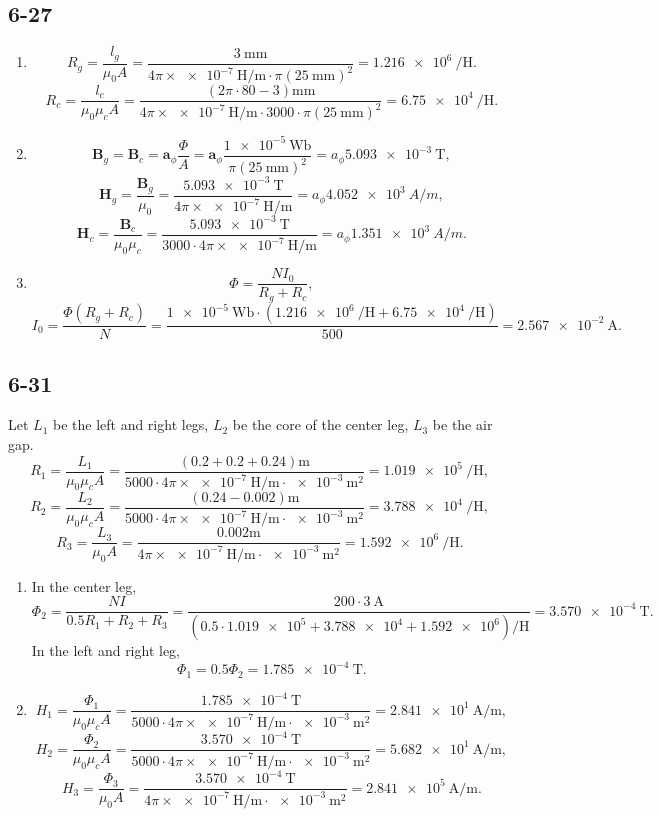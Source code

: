 \documentclass[11pt,a4paper]{article}
\author{\href{liuyh615@sjtu.edu.cn}{Yihao Liu} (515370910207)}
\subtitle{Homework}
\begin{document}
\maketitle

\subsection{6-27}
\begin{enumerate}[label=\alph*)]
\item
$$R_g=\frac{l_g}{\mu_0A}=\frac{\SI{3}{\milli\meter}}{4\pi\times\SI{e-7}{\henry/\meter}\cdot\pi(\SI{25}{\milli\meter})^2}=\SI{1.216e6}{\per\henry}.$$
$$R_c=\frac{l_c}{\mu_0\mu_cA}=\frac{(2\pi\cdot 80-3)\si{\milli\meter}}{4\pi\times\SI{e-7}{\henry/\meter}\cdot3000\cdot\pi(\SI{25}{\milli\meter})^2}=\SI{6.75e4}{\per\henry}.$$
\item
$$\mathbf{B}_g=\mathbf{B}_c=\mathbf{a}_\phi\frac{\Phi}{A}=\mathbf{a}_\phi\frac{\SI{1e-5}{\weber}}{\pi(\SI{25}{\milli\meter})^2}={a}_\phi\SI{5.093e-3}{\tesla},$$
$$\mathbf{H}_g=\frac{\mathbf{B}_g}{\mu_0}=\frac{\SI{5.093e-3}{\tesla}}{4\pi\times\SI{e-7}{\henry/\meter}}={a}_\phi\SI{4.052e3}{A/m},$$
$$\mathbf{H}_c=\frac{\mathbf{B}_c}{\mu_0\mu_c}=\frac{\SI{5.093e-3}{\tesla}}{3000\cdot4\pi\times\SI{e-7}{\henry/\meter}}={a}_\phi\SI{1.351e3}{A/m}.$$
\item
$$\Phi=\frac{NI_0}{R_g+R_c},$$
$$I_0=\frac{\Phi(R_g+R_c)}{N}=\frac{\SI{1e-5}{\weber}\cdot(\SI{1.216e6}{\per\henry}+\SI{6.75e4}{\per\henry})}{500}=\SI{2.567e-2}{\ampere}.$$
\end{enumerate}

\subsection{6-31}
Let $L_1$ be the left and right legs, $L_2$ be the core of the center leg, $L_3$ be the air gap.
$$R_1=\frac{L_1}{\mu_0\mu_cA}=\frac{(0.2+0.2+0.24)\si{\meter}}{5000\cdot4\pi\times\SI{e-7}{\henry/\meter}\cdot\SI{e-3}{\meter\squared}}=\SI{1.019e5}{\per\henry},$$
$$R_2=\frac{L_2}{\mu_0\mu_cA}=\frac{(0.24-0.002)\si{\meter}}{5000\cdot4\pi\times\SI{e-7}{\henry/\meter}\cdot\SI{e-3}{\meter\squared}}=\SI{3.788e4}{\per\henry},$$
$$R_3=\frac{L_3}{\mu_0A}=\frac{0.002\si{\meter}}{4\pi\times\SI{e-7}{\henry/\meter}\cdot\SI{e-3}{\meter\squared}}=\SI{1.592e6}{\per\henry}.$$
\begin{enumerate}[label=\alph*)]
\item
In the center leg,
$$\Phi_2=\frac{NI}{0.5R_1+R_2+R_3}=\frac{200\cdot\SI{3}{\ampere}}{(0.5\cdot\num{1.019e5}+\num{3.788e4}+\num{1.592e6})\si{\per\henry}}=\SI{3.570e-4}{\tesla}.$$
In the left and right leg,
$$\Phi_1=0.5\Phi_2=\SI{1.785e-4}{\tesla}.$$
\item
$$H_1=\frac{\Phi_1}{\mu_0\mu_cA}=\frac{\SI{1.785e-4}{\tesla}}{5000\cdot4\pi\times\SI{e-7}{\henry/\meter}\cdot\SI{e-3}{\meter\squared}}=\SI{2.841e1}{\ampere/\meter},$$
$$H_2=\frac{\Phi_2}{\mu_0\mu_cA}=\frac{\SI{3.570e-4}{\tesla}}{5000\cdot4\pi\times\SI{e-7}{\henry/\meter}\cdot\SI{e-3}{\meter\squared}}=\SI{5.682e1}{\ampere/\meter},$$
$$H_3=\frac{\Phi_3}{\mu_0A}=\frac{\SI{3.570e-4}{\tesla}}{4\pi\times\SI{e-7}{\henry/\meter}\cdot\SI{e-3}{\meter\squared}}=\SI{2.841e5}{\ampere/\meter}.$$
\end{enumerate}
\end{document}
